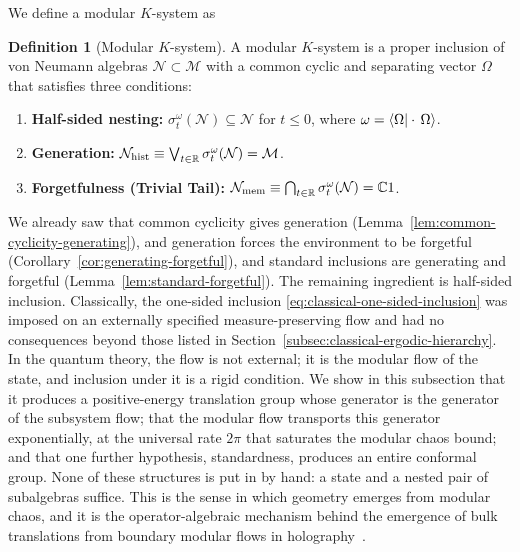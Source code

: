 \documentclass[a4paper,11pt]{article}
\theoremstyle{definition}
\newtheorem{definition}{Definition}[section]
\begin{document}
We define a modular $K$-system as
\begin{definition}[Modular $K$-system]
\label{def:quantum-K-system}
A modular $K$-system is a proper inclusion of von Neumann algebras $\mathcal N \subset \mathcal M$ with a common cyclic and separating vector $\Omega$ that satisfies three conditions:
\begin{enumerate}
    \item \textbf{Half-sided nesting:} $\sigma^\omega_t(\mathcal N) \subseteq \mathcal N$ for $t \le 0$, where $\omega = \braket{\Omega | \cdot \, \Omega}$.
    \item \textbf{Generation:} $\mathcal N_{\rm hist} \equiv \bigvee_{t \in \mathbb R} \sigma^\omega_t(\mathcal N) = \mathcal M$.
    \item \textbf{Forgetfulness (Trivial Tail):} $\mathcal N_{\rm mem} \equiv \bigcap_{t \in \mathbb R} \sigma^\omega_t(\mathcal N) = \mathbb C1$.
\end{enumerate}
\end{definition}



We already saw that common cyclicity gives generation (Lemma~\ref{lem:common-cyclicity-generating}), and generation forces the environment to be forgetful (Corollary~\ref{cor:generating-forgetful}), and standard inclusions are generating and forgetful (Lemma~\ref{lem:standard-forgetful}). The remaining ingredient is half-sided inclusion. Classically, the one-sided inclusion \eqref{eq:classical-one-sided-inclusion} was imposed on an externally specified measure-preserving flow and had no consequences beyond those listed in Section~\ref{subsec:classical-ergodic-hierarchy}. In the quantum theory, the flow is not external; it is the modular flow of the state, and inclusion under it is a rigid condition. We show in this subsection that it produces a positive-energy translation group whose generator is the generator of the subsystem flow; that the modular flow transports this generator exponentially, at the universal rate $2\pi$ that saturates the modular chaos bound; and that one further hypothesis, standardness, produces an entire conformal group. None of these structures is put in by hand: a state and a nested pair of subalgebras suffice. This is the sense in which geometry emerges from modular chaos, and it is the operator-algebraic mechanism behind the emergence of bulk translations from boundary modular flows in holography~\cite{deBoerLamprou2020,LeutheusserLiu2023}.
\end{document}
